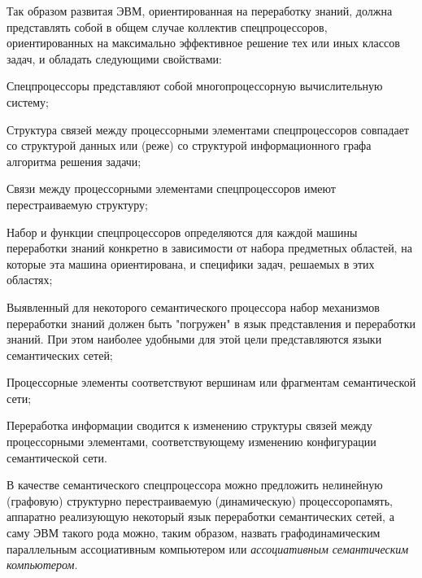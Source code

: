 Так образом развитая ЭВМ, ориентированная на переработку знаний, должна представлять собой в общем случае коллектив спецпроцессоров, ориентированных на максимально эффективное решение тех или иных классов задач, и обладать следующими свойствами:
\begin{textitemize}
\item Спецпроцессоры представляют собой многопроцессорную вычислительную систему;
\item Структура связей между процессорными элементами спецпроцессоров совпадает со структурой данных или (реже) со структурой информационного графа алгоритма решения задачи;
\item Связи между процессорными элементами спецпроцессоров имеют перестраиваемую структуру;
\item Набор и функции спецпроцессоров определяются для каждой машины переработки знаний конкретно в зависимости от набора предметных областей, на которые эта машина ориентирована, и специфики задач, решаемых в этих областях;
\item Выявленный для некоторого семантического процессора набор механизмов переработки знаний должен быть "погружен"{} в язык представления и переработки знаний. При этом наиболее удобными для этой цели представляются языки семантических сетей;
\item Процессорные элементы соответствуют вершинам или фрагментам семантической сети;
\item Переработка информации сводится к изменению структуры связей между процессорными элементами, соответствующему изменению конфигурации семантической сети.
\end{textitemize}

В качестве семантического спецпроцессора можно предложить нелинейную (графовую) структурно перестраиваемую (динамическую) процессоропамять, аппаратно реализующую некоторый язык переработки семантических сетей, а саму ЭВМ такого рода можно, таким образом, назвать графодинамическим параллельным ассоциативным компьютером или \textit{ассоциативным семантическим компьютером}.

